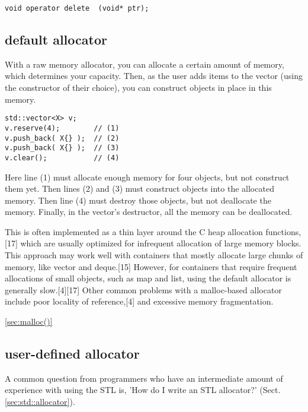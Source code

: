 \begin{verbatim}
void operator delete  (void* ptr); 
\end{verbatim}



\subsection{default allocator}
\label{sec:allocator-default}

With a raw memory allocator, you can allocate a certain amount of memory, which
determines your capacity. Then, as the user adds items to the vector (using the
constructor of their choice), you can construct objects in place in this memory.


\begin{lstlisting}
std::vector<X> v;
v.reserve(4);        // (1)
v.push_back( X{} );  // (2)
v.push_back( X{} );  // (3)
v.clear();           // (4)
\end{lstlisting}

Here line (1) must allocate enough memory for four objects, but not construct
them yet. Then lines (2) and (3) must construct objects into the allocated
memory. Then line (4) must destroy those objects, but not deallocate the memory.
Finally, in the vector's destructor, all the memory can be deallocated.

This is often implemented as a thin layer around the C heap allocation
functions,[17] which are usually optimized for infrequent allocation of large
memory blocks. This approach may work well with containers that mostly allocate
large chunks of memory, like vector and deque.[15] However, for containers that
require frequent allocations of small objects, such as map and list, using the
default allocator is generally slow.[4][17] Other common problems with a
malloc-based allocator include poor locality of reference,[4] and excessive
memory fragmentation.

\ref{sec:malloc()}

\subsection{user-defined allocator}
\label{sec:allocator-user-defined}

A common question from programmers who have an intermediate amount of experience
with using the STL is, 'How do I write an STL allocator?' (Sect.\ref{sec:std::allocator}).

